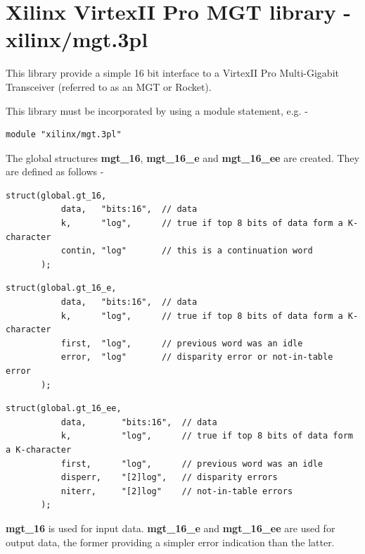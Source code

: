 \pagebreak

\section{Xilinx VirtexII Pro MGT library - xilinx/mgt.3pl}

    This library provide a simple 16 bit interface to a VirtexII Pro
    Multi-Gigabit Transceiver (referred to as an MGT or Rocket).
    
    This library must be incorporated by using a module statement, e.g. -
    \begin{lstlisting}[gobble=4, language=threepl]
       module "xilinx/mgt.3pl"
    \end{lstlisting}
    
    The global structures {\bf mgt\_16}, {\bf mgt\_16\_e} and {\bf mgt\_16\_ee}
    are created. They are defined as follows -

    \begin{lstlisting}[gobble=4, language=threepl]
       struct(global.gt_16,
           data,   "bits:16",  // data
           k,      "log",      // true if top 8 bits of data form a K-character
           contin, "log"       // this is a continuation word
       );
    \end{lstlisting}

    \begin{lstlisting}[gobble=4, language=threepl]
       struct(global.gt_16_e,
           data,   "bits:16",  // data
           k,      "log",      // true if top 8 bits of data form a K-character
           first,  "log",      // previous word was an idle
           error,  "log"       // disparity error or not-in-table error
       );
    \end{lstlisting}

    \begin{lstlisting}[gobble=4, language=threepl]
       struct(global.gt_16_ee,
           data,       "bits:16",  // data
           k,          "log",      // true if top 8 bits of data form a K-character
           first,      "log",      // previous word was an idle
           disperr,    "[2]log",   // disparity errors
           niterr,     "[2]log"    // not-in-table errors
       );
    \end{lstlisting}

    {\bf mgt\_16} is used for input data. {\bf mgt\_16\_e} and
    {\bf mgt\_16\_ee} are used for output data, the former providing a simpler
    error indication than the latter.
    
